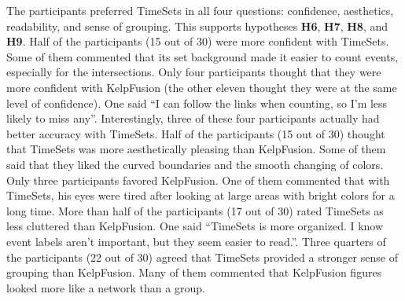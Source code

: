 The participants preferred TimeSets in all four questions: confidence, aesthetics, readability, and sense of grouping. This supports hypotheses \textbf{H6}, \textbf{H7}, \textbf{H8}, and \textbf{H9}. Half of the participants (15 out of 30) were more confident with TimeSets. Some of them commented that its set background made it easier to count events, especially for the intersections. Only four participants thought that they were more confident with KelpFusion (the other eleven thought they were at the same level of confidence). One said ``I can follow the links when counting, so I'm less likely to miss any''. Interestingly, three of these four participants actually had better accuracy with TimeSets. Half of the participants (15 out of 30) thought that TimeSets was more aesthetically pleasing than KelpFusion. Some of them said that they liked the curved boundaries and the smooth changing of colors. Only three participants favored KelpFusion. One of them commented that with TimeSets, his eyes were tired after looking at large areas with bright colors for a long time. More than half of the participants (17 out of 30) rated TimeSets as less cluttered than KelpFusion. One said ``TimeSets is more organized. I know event labels aren't important, but they seem easier to read.''. Three quarters of the participants (22 out of 30) agreed that TimeSets provided a stronger sense of grouping than KelpFusion. Many of them commented that KelpFusion figures looked more like a network than a group.